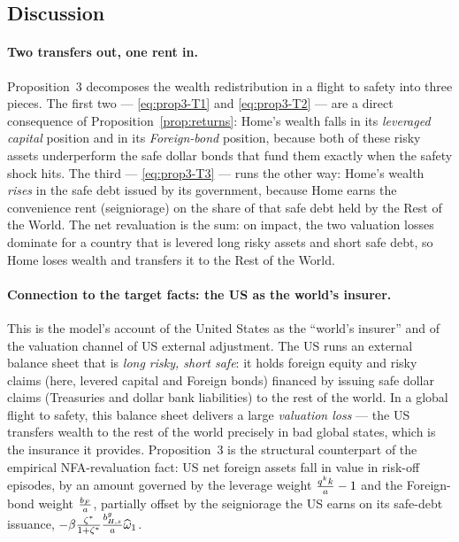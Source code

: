 \subsection{Discussion}

\paragraph{Two transfers out, one rent in.} Proposition~3 decomposes the wealth
redistribution in a flight to safety into three pieces. The first two ---
\eqref{eq:prop3-T1} and \eqref{eq:prop3-T2} --- are a direct consequence of
Proposition~\ref{prop:returns}: Home's wealth falls in its \emph{leveraged
capital} position and in its \emph{Foreign-bond} position, because both of these
risky assets underperform the safe dollar bonds that fund them exactly when the
safety shock hits. The third --- \eqref{eq:prop3-T3} --- runs the other way:
Home's wealth \emph{rises} in the safe debt issued by its government, because Home
earns the convenience rent (seigniorage) on the share of that safe debt held by
the Rest of the World. The net revaluation is the sum: on impact, the two
valuation losses dominate for a country that is levered long risky assets and
short safe debt, so Home loses wealth and transfers it to the Rest of the World.

\paragraph{Connection to the target facts: the US as the world's insurer.} This
is the model's account of the United States as the ``world's insurer'' and of the
valuation channel of US external adjustment. The US runs an external balance sheet
that is \emph{long risky, short safe}: it holds foreign equity and risky claims
(here, levered capital and Foreign bonds) financed by issuing safe dollar claims
(Treasuries and dollar bank liabilities) to the rest of the world. In a global
flight to safety, this balance sheet delivers a large \emph{valuation loss} ---
the US transfers wealth to the rest of the world precisely in bad global states,
which is the insurance it provides. Proposition~3 is the structural counterpart of
the empirical NFA-revaluation fact: US net foreign assets fall in value in risk-off
episodes, by an amount governed by the leverage weight $\frac{q^{k} k}{a}-1$ and
the Foreign-bond weight $\frac{b_F}{a}$, partially offset by the seigniorage
the US earns on its safe-debt issuance, $-\beta\frac{\zeta^{*}}{1+\zeta^{*}}\frac{b^g_{H,s}}{a}\widehat{\omega}_1$.

